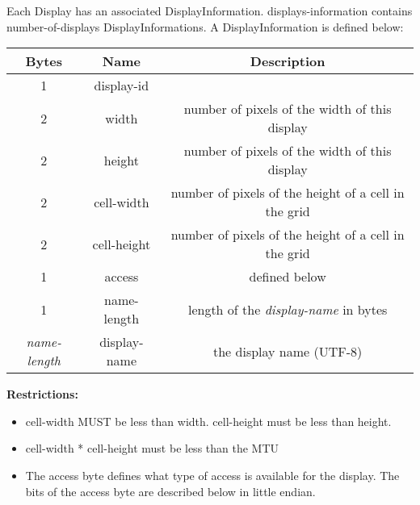 Each Display has an associated DisplayInformation. displays-information contains
number-of-displays DisplayInformations. A DisplayInformation is defined below:

\begin{center}
    \begin{tabular}{|c|c|c|}
        \hline
        \textbf{Bytes}     & \textbf{Name} & \textbf{Description}                                 \\
        \hline
        1                  & display-id    &                                                      \\
        \hline
        2                  & width         & number of pixels of the width of this display        \\
        \hline
        2                  & height        & number of pixels of the width of this display        \\
        \hline
        2                  & cell-width    & number of pixels of the height of a cell in the grid \\
        \hline
        2                  & cell-height   & number of pixels of the height of a cell in the grid \\
        \hline
        1                  & access        & defined below                                        \\
        \hline
        1                  & name-length   & length of the \emph{display-name} in bytes           \\
        \hline
        \emph{name-length} & display-name  & the display name (UTF-8)                             \\
        \hline
    \end{tabular}
\end{center}

\textbf{Restrictions:}

\begin{itemize}
    \item cell-width MUST be less than width. cell-height must be less than height.\\
    \item cell-width * cell-height must be less than the MTU
    \item The access byte defines what type of access is available for the display. The bits of the
    access byte are described below in little endian.
\end{itemize}


